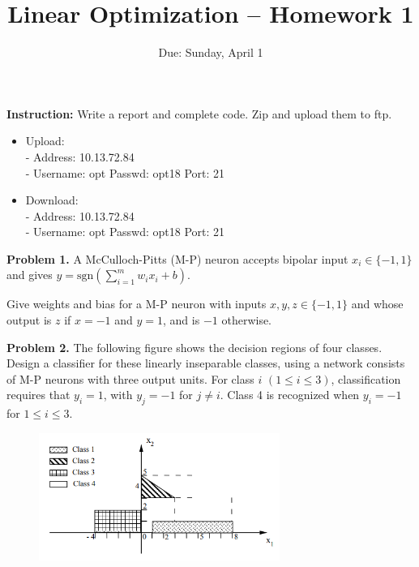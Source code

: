 \documentclass[12pt]{article}
\title{Linear Optimization -- Homework 1}
\author{Due: Sunday, April  1}
\date{}
\begin{document}
\maketitle


\noindent \textbf{Instruction:} Write a report and complete code. Zip and upload them to ftp. \\ 
\begin{itemize}[noitemsep]
	\item Upload:  \\
	- Address: 10.13.72.84 \\ 
	- Username: opt Passwd:  opt18 Port: 21 
	\item Download: \\
	- Address: 10.13.72.84 \\ 
	- Username: opt Passwd:  opt18 	Port: 21
\end{itemize}


{\vspace{1em} } 


\textbf{Problem 1.}
A McCulloch-Pitts (M-P) neuron accepts bipolar input $x_i \in \{-1,1\}$ and gives  $y=\mathrm{sgn} (\sum_{i=1}^{m} w_ix_i + b) $.

Give weights and bias for a M-P neuron with inputs
$x,y,z \in \{-1,1\}$ and whose output is  $z$ if $x = -1$ and $y = 1$, and is $-1$ otherwise.


\vspace{1em}


\textbf{Problem 2.}
The following figure shows the decision regions of four classes. Design a
classifier for these linearly inseparable classes, using a network consists of M-P neurons with
three output units. For class $i$ $(1 \le i \le 3)$, classification requires that $y_i = 1$, with $y_j = -1$ for
$j \ne i$. Class 4 is recognized when $y_i = -1$ for $1 \le i \le 3$. 

\begin{figure}[h]
	\centering
	\includegraphics[width=0.7\textwidth]{fig/2018-03-17-14-09-07.png}
\end{figure}
\end{document}
